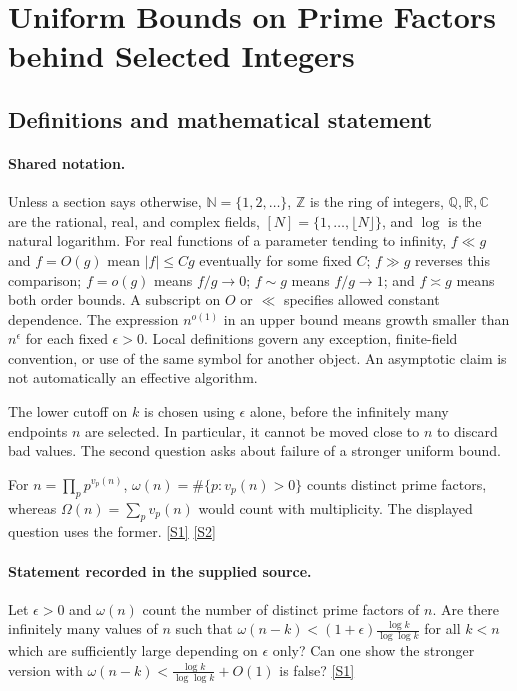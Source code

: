 \documentclass[11pt,a4paper]{article}
\newcommand{\N}{\mathbb{N}}
\newcommand{\Z}{\mathbb{Z}}
\newcommand{\Q}{\mathbb{Q}}
\newcommand{\R}{\mathbb{R}}
\newcommand{\C}{\mathbb{C}}
\newcommand{\sref}[2]{\hyperlink{source:#1:#2}{[S#2]}}
\begin{document}
\section{Uniform Bounds on Prime Factors behind Selected Integers}\label{statement}


\subsection{Definitions and mathematical statement}

\paragraph{Shared notation.}Unless a section says otherwise, $\N=\{1,2,\ldots\}$,
$\Z$ is the ring of integers, $\Q,\R,\C$ are the rational, real, and complex
fields, $[N]=\{1,\ldots,\lfloor N\rfloor\}$, and $\log$ is the natural
logarithm. For real functions of a parameter tending to infinity,
$f\ll g$ and $f=O(g)$ mean $|f|\leq Cg$ eventually for some fixed $C$;
$f\gg g$ reverses this comparison; $f=o(g)$ means $f/g\to0$;
$f\sim g$ means $f/g\to1$; and $f\asymp g$ means both order bounds.
A subscript on $O$ or $\ll$ specifies allowed constant dependence.
The expression $n^{o(1)}$ in an upper bound means growth smaller than
$n^\epsilon$ for each fixed $\epsilon>0$. Local definitions govern any
exception, finite-field convention, or use of the same symbol for another
object. An asymptotic claim is not automatically an effective algorithm.



The lower cutoff on $k$ is chosen using $\epsilon$ alone, before the infinitely many endpoints $n$ are selected. In particular, it cannot be moved close to $n$ to discard bad values. The second question asks about failure of a stronger uniform bound.

For $n=\prod_pp^{v_p(n)}$, $\omega(n)=\#\{p:v_p(n)>0\}$ counts distinct prime factors, whereas $\Omega(n)=\sum_pv_p(n)$ would count with multiplicity. The displayed question uses the former. \sref{statement}{1} \sref{statement}{2}

\paragraph{Statement recorded in the supplied source.}
Let $\epsilon>0$ and $\omega(n)$ count the number of distinct prime factors of $n$. Are there infinitely many values of $n$ such that $ \omega(n-k) < (1+\epsilon)\frac{\log k}{\log\log k} $ for all $k<n$ which are sufficiently large depending on $\epsilon$ only?
Can one show the stronger version with $ \omega(n-k) < \frac{\log k}{\log\log k}+O(1) $ is false? \sref{statement}{1}
\end{document}
